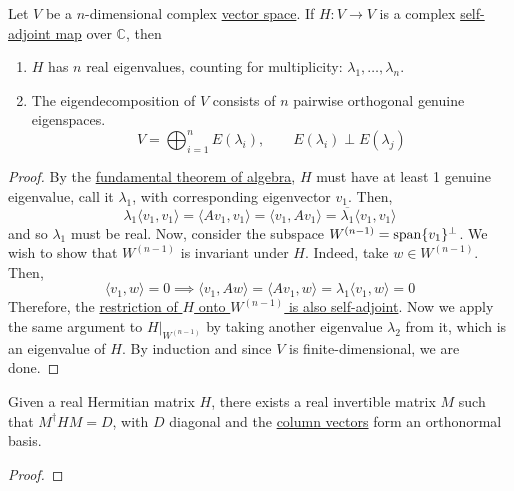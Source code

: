   \begin{theorem}
    \label{thm:spectral-theorem-of-self-adjoint-maps}
		Let $V$ be a $n$-dimensional complex \hyperref[def:vector-space]{vector space}. If $H: V \to V$ is a complex \hyperref[def:self-adjoint-map]{self-adjoint map} over $\mathbb{C}$, then 
		\begin{enumerate}
			\item $H$ has $n$ real eigenvalues, counting for multiplicity: $\lambda_1, \ldots, \lambda_n$. 
			\item The eigendecomposition of $V$ consists of $n$ pairwise orthogonal genuine eigenspaces. 
				\begin{equation}
					V = \bigoplus_{i=1}^n E(\lambda_i), \qquad E(\lambda_i) \perp E(\lambda_j)
				\end{equation}
		\end{enumerate}
  \end{theorem}
	\begin{proof}
		By the \hyperref[at-thm:fundamental-theorem-of-algebra]{fundamental theorem of algebra}, $H$ must have at least 1 genuine eigenvalue, call it $\lambda_1$, with corresponding eigenvector $v_1$. Then, 
		\begin{equation}
			\lambda_1 \langle v_1, v_1 \rangle = \langle Av_1, v_1 \rangle = \langle v_1, A v_1 \rangle = \overline{\lambda_1} \langle v_1, v_1 \rangle
		\end{equation}
		and so $\lambda_1$ must be real. Now, consider the subspace $W^{(n-1)} = \operatorname{span}\{ v_1 \}^\perp$. We wish to show that $W^{(n-1)}$ is invariant under $H$. Indeed, take $w \in W^{(n-1)}$. Then, 
		\begin{equation}
		  \langle v_1, w \rangle = 0 \implies \langle v_1, A w \rangle = \langle A v_1, w \rangle = \lambda_1 \langle v_1, w \rangle = 0
		\end{equation}
		Therefore, the \hyperref[thm:restriction_self_adjoint]{restriction of $H$ onto $W^{(n-1)}$ is also self-adjoint}. Now we apply the same argument to $H|_{W^{(n-1)}}$ by taking another eigenvalue $\lambda_2$ from it, which is an eigenvalue of $H$. By induction and since $V$ is finite-dimensional, we are done. 
	\end{proof}

	\begin{corollary}
	  \label{thm:diagonalizability-of-hermitian-matrix}
    Given a real Hermitian matrix $H$, there exists a real invertible matrix $M$ such that $M^\dagger H M = D$, with $D$ diagonal and the \hyperref[def:column-vector]{column vectors} form an orthonormal basis.
  \end{corollary}
	\begin{proof}
	  
	\end{proof}

